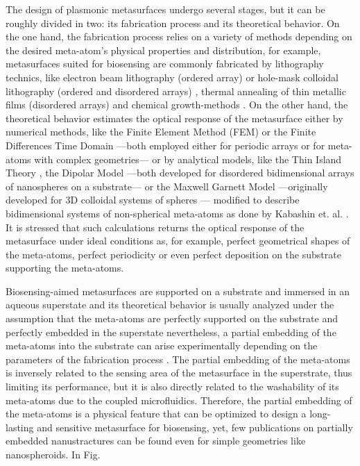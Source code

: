 The design of plasmonic metasurfaces undergo several stages, but it can be roughly divided in two: its fabrication process and its theoretical behavior. On the one hand, the fabrication process relies on a variety of methods depending on the desired meta-atom's physical properties and distribution, for example, metasurfaces suited for biosensing are commonly  fabricated by lithography technics, like electron beam lithography (ordered array) or hole-mask colloidal lithography  (ordered and disordered arrays) \cite{estevez_trends_2014}, thermal annealing of thin metallic films (disordered arrays)  \cite{qiu_dual_2020} and chemical growth-methods \cite{estevez_trends_2014,kabashin_plasmonic_2009}. On the other hand, the theoretical behavior estimates the optical response of the metasurface either by numerical methods, like the Finite Element Method (FEM) \cite{feuz_improving_2010} or the Finite Differences Time Domain \cite{qiu_differential_2015} ---both employed either for periodic arrays or for meta-atoms with complex geometries--- or by analytical models, like the Thin Island Theory \cite{svedendahl_refractometric_2014,bedeaux_optical_2004}, the Dipolar Model \cite{barrera1991optical} ---both developed for disordered bidimensional arrays of nanospheres on a substrate--- or the Maxwell Garnett Model ---originally developed for 3D colloidal systems of spheres \cite{sihvola_electromagnetic_2008}--- modified to describe bidimensional systems of non-spherical meta-atoms \cite{oates_characterization_2011} as done by Kabashin et. al. \cite{kabashin_plasmonic_2009}. It is stressed that such calculations returns the optical response of the metasurface under ideal conditions as, for example, perfect geometrical shapes of the meta-atoms, perfect periodicity or even perfect deposition on the substrate supporting the meta-atoms.

Biosensing-aimed metasurfaces are supported on a substrate and immersed in an aqueous superstate \cite{estevez_trends_2014} and its theoretical behavior is usually analyzed under the assumption that the meta-atoms are perfectly supported on the substrate and perfectly embedded in the superstate  \cite{kabashin_plasmonic_2009,qiu_differential_2015,barrera1991optical,svedendahl_refractometric_2014,bedeaux_optical_2004} nevertheless, a partial embedding of the meta-atoms into the substrate can arise experimentally depending on the parameters of the fabrication process  \cite{meng_anisotropic_2015,moirangthem_enhanced_2012}. The partial embedding of the meta-atoms is inversely related to the sensing area of the metasurface in the superstrate, thus limiting its performance, but it is also directly related to the washability of its meta-atoms due to the coupled microfluidics. Therefore, the partial embedding of the meta-atoms is a physical feature that can be optimized to design a long-lasting and sensitive metasurface for biosensing, yet, few publications on partially embedded nanustractures can be found even for simple geometries like nanospheroids. In Fig. 

